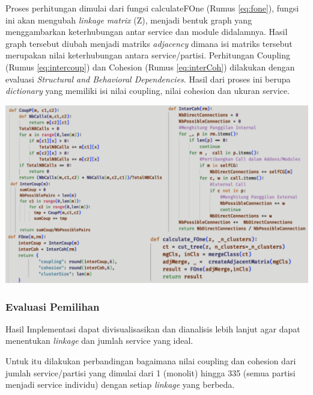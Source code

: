 Proses perhitungan dimulai dari fungsi calculateFOne (Rumus \ref{eq:fone}), fungsi ini akan mengubah \textit{linkage} \textit{matrix} (Z), menjadi bentuk graph yang menggambarkan keterhubungan antar service dan module didalamnya. Hasil graph tersebut diubah menjadi matriks \textit{adjacency} dimana isi matriks tersebut merupakan nilai keterhubungan antara service/partisi. Perhitungan Coupling (Rumus \ref{eq:intercoup}) dan Cohesion (Rumus \ref{eq:interCoh}) dilakukan dengan evaluasi \textit{Structural and Behavioral Dependencies}. 
Hasil dari proses ini berupa \textit{dictionary} yang memiliki isi nilai coupling, nilai cohesion dan ukuran service.

\begin{center}
	\includegraphics[width=14cm]{img/bab_4/coding_evaluasi.png}
	\label{fig:coding_evaluasi}
\end{center}


\subsubsection{Evaluasi Pemilihan}
Hasil Implementasi dapat divisualisasikan dan dianalisis lebih lanjut agar dapat menentukan \textit{linkage} dan jumlah service yang ideal. 

Untuk itu dilakukan perbandingan bagaimana nilai coupling dan cohesion dari jumlah service/partisi yang dimulai dari 1 (monolit) hingga 335 (semua partisi menjadi service individu) dengan setiap \textit{linkage} yang berbeda.

